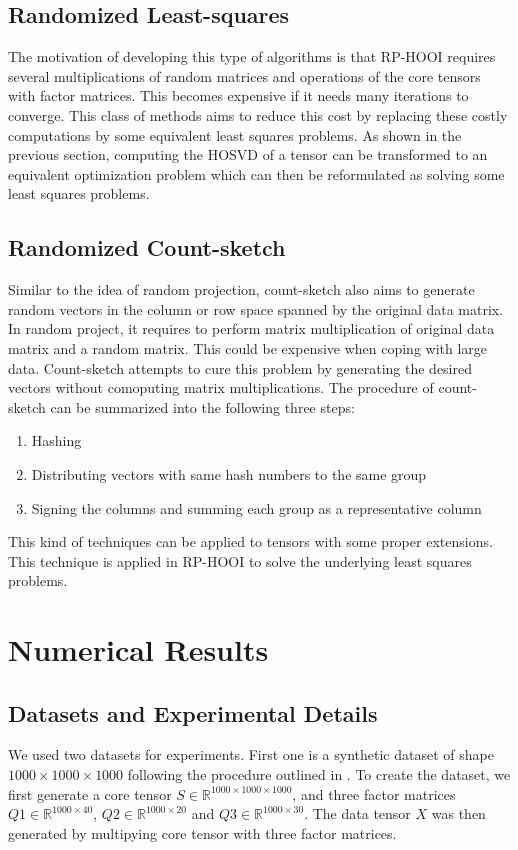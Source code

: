 \documentclass[preprint]{elsarticle}
\begin{document}
\subsection{Randomized Least-squares}
\noindent The motivation of developing this type of algorithms is that RP-HOOI requires several multiplications of random matrices and operations of the core tensors
with factor matrices. This becomes expensive if it needs many iterations to converge. This class of methods aims to reduce this cost by
replacing these costly computations by some equivalent least squares problems. As shown in the previous section, computing the HOSVD of a tensor
can be transformed to an equivalent optimization problem which can then be reformulated as solving some least squares problems.
\subsection{Randomized Count-sketch}
\noindent Similar to the idea of random projection, count-sketch also aims to generate random vectors in the column 
or row space spanned by the original data matrix. In random project, it requires to perform matrix multiplication of original data matrix
and a random matrix. This could be expensive when coping with large data. Count-sketch attempts to cure this problem by generating the desired
vectors without comoputing matrix multiplications. The procedure of count-sketch can be summarized into the
following three steps:
\begin{enumerate}
    \item Hashing
    \item Distributing vectors with same hash numbers to the same group
    \item Signing the columns and summing each group as a representative column
\end{enumerate}
This kind of techniques can be applied to tensors with some proper extensions. This technique is applied in RP-HOOI
to solve the underlying least squares problems.

\pagebreak
\section{Numerical Results}

\subsection{Datasets and Experimental Details}
\noindent We used two datasets for experiments. First one is a synthetic dataset of shape $1000\times1000\times1000$ following the procedure outlined in \cite{9350569}. To create the dataset, we first generate a core tensor $S \in   \mathbb{R}^{1000\times1000\times1000}$, and three factor matrices $Q1 \in \mathbb{R}^{1000\times40}$, $Q2 \in \mathbb{R}^{1000\times20}$ and $Q3 \in \mathbb{R}^{1000\times30}$. The data tensor $X$ was then generated by multipying core tensor with three factor matrices.
\end{document}
